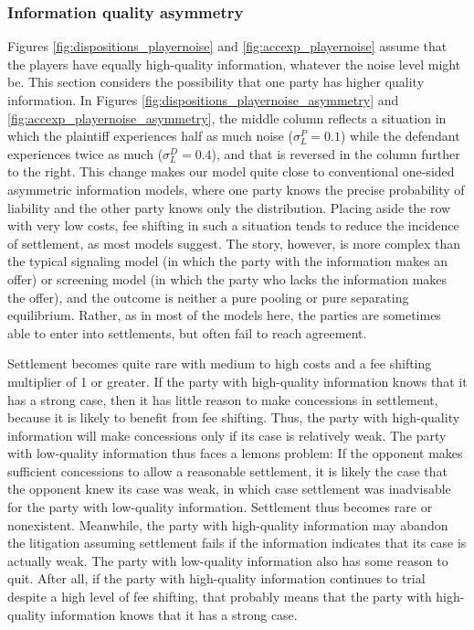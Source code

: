 \documentclass{article}
\begin{document}
\subsubsection{Information quality asymmetry}

Figures \ref{fig:dispositions_playernoise} and \ref{fig:accexp_playernoise} assume that the players have equally high-quality information, whatever the noise level might be. This section considers the possibility that one party has higher quality information. In Figures \ref{fig:dispositions_playernoise_asymmetry} and \ref{fig:accexp_playernoise_asymmetry}, the middle column reflects a situation in which the plaintiff experiences half as much noise ($\sigma_{L}^P=0.1$) while the defendant experiences twice as much ($\sigma_{L}^D=0.4$), and that is reversed in the column further to the right. This change makes our model quite close to conventional one-sided asymmetric information models, where one party knows the precise probability of liability and the other party knows only the distribution. Placing aside the row with very low costs, fee shifting in such a situation tends to reduce the incidence of settlement, as most models suggest. The story, however, is more complex than the typical signaling model (in which the party with the information makes an offer) or screening model (in which the party who lacks the information makes the offer), and the outcome is neither a pure pooling or pure separating equilibrium. Rather, as in most of the models here, the parties are sometimes able to enter into settlements, but often fail to reach agreement. 

Settlement becomes quite rare with medium to high costs and a fee shifting multiplier of 1 or greater. If the party with high-quality information knows that it has a strong case, then it has little reason to make concessions in settlement, because it is likely to benefit from fee shifting. Thus, the party with high-quality information will make concessions only if its case is relatively weak. The party with low-quality information thus faces a lemons problem: If the opponent makes sufficient concessions to allow a reasonable settlement, it is likely the case that the opponent knew its case was weak, in which case settlement was inadvisable for the party with low-quality information. Settlement thus becomes rare or nonexistent. Meanwhile, the party with high-quality information may abandon the litigation assuming settlement fails if the information indicates that its case is actually weak. The party with low-quality information also has some reason to quit. After all, if the party with high-quality information continues to trial despite a high level of fee shifting, that probably means that the party with high-quality information knows that it has a strong case. 
\end{document}
